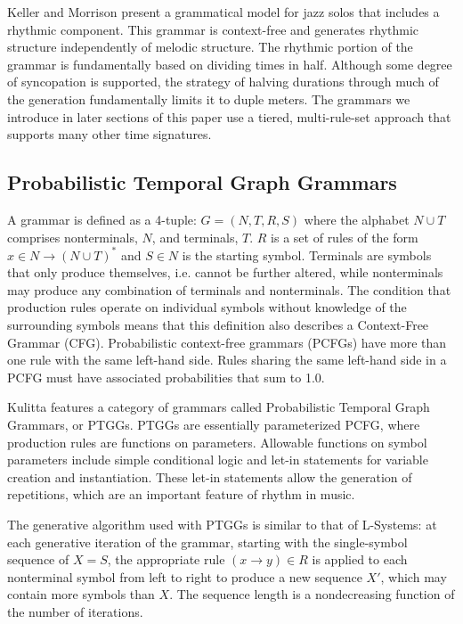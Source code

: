 \documentclass{article}
\begin{document}
Keller and Morrison present a grammatical model for jazz solos that includes a rhythmic component\cite{keller}. This grammar is context-free and generates rhythmic structure independently of melodic structure. The rhythmic portion of the grammar is fundamentally based on dividing times in half. Although some degree of syncopation is supported, the strategy of halving durations through much of the generation fundamentally limits it to duple meters. The grammars we introduce in later sections of this paper use a tiered, multi-rule-set approach that supports many other time signatures. 

\subsection{Probabilistic Temporal Graph Grammars}

A grammar is defined as a 4-tuple: $G = (N,T,R,S)$ where the alphabet $N \cup T$ comprises nonterminals, $N$, and terminals, $T$. $R$ is a set of rules of the form $x \in N \rightarrow (N \cup T)^{*}$ and $S \in N$ is the starting symbol. Terminals are symbols that only produce themselves, i.e. cannot be further altered, while nonterminals may produce any combination of terminals and nonterminals. The condition that production rules operate on individual symbols without knowledge of the surrounding symbols means that this definition also describes a Context-Free Grammar (CFG). Probabilistic context-free grammars (PCFGs) have more than one rule with the same left-hand side. Rules sharing the same left-hand side in a PCFG must have associated probabilities that sum to 1.0.

Kulitta features a category of grammars called Probabilistic Temporal Graph Grammars\cite{quick2013farm, quick_thesis}, or PTGGs. PTGGs are essentially parameterized PCFG, where production \linebreak rules are functions on parameters. Allowable functions on symbol parameters include simple conditional logic and let-in statements for variable creation and instantiation. \linebreak These let-in statements allow the generation of repetitions, which are an important feature of rhythm in music.

The generative algorithm used with PTGGs is similar to that of L-Systems: at each generative iteration of the grammar, starting with the single-symbol sequence of $X = S$, the appropriate rule $(x \rightarrow y) \in R$ is applied to each nonterminal symbol from left to right to produce a new sequence $X'$, which may contain more symbols than $X$. The sequence length is a nondecreasing function of the number of iterations. 
\end{document}
